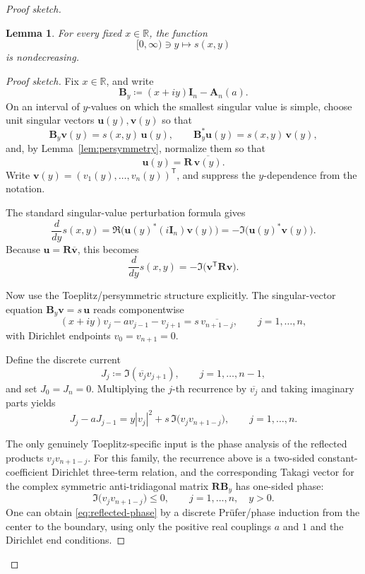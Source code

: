 \documentclass[11pt]{article}
\newtheorem{lemma}[theorem]{Lemma}
\begin{document}
\begin{proof}[Proof sketch]
\begin{lemma}\label{lem:vertical-monotonicity}
For every fixed \(x\in\mathbb R\), the function
\[
[0,\infty)\ni y\longmapsto s(x,y)
\]
is nondecreasing.
\end{lemma}

\begin{proof}[Proof sketch]
Fix \(x\in\mathbb R\), and write
\[
\mathbf B_y\coloneqq (x+iy)\mathbf I_n-\mathbf A_n(a).
\]
On an interval of \(y\)-values on which the smallest singular value is simple, choose
unit singular vectors \(\mathbf u(y),\mathbf v(y)\) so that
\[
\mathbf B_y\mathbf v(y)=s(x,y)\,\mathbf u(y),
\qquad
\mathbf B_y^*\mathbf u(y)=s(x,y)\,\mathbf v(y),
\]
and, by Lemma~\ref{lem:persymmetry}, normalize them so that
\[
\mathbf u(y)=\mathbf R\,\overline{\mathbf v(y)}.
\]
Write \(\mathbf v(y)=(v_1(y),\dots,v_n(y))^{\mathsf T}\), and suppress the \(y\)-dependence
from the notation.

The standard singular-value perturbation formula gives
\[
\frac{d}{dy}s(x,y)
=
\Re\!\bigl(\mathbf u(y)^* (i\mathbf I_n)\mathbf v(y)\bigr)
=
-\Im\!\bigl(\mathbf u(y)^*\mathbf v(y)\bigr).
\]
Because \(\mathbf u=\mathbf R\overline{\mathbf v}\), this becomes
\[
\frac{d}{dy}s(x,y)
=
-\Im\!\bigl(\mathbf v^{\mathsf T}\mathbf R\mathbf v\bigr).
\]

Now use the Toeplitz/persymmetric structure explicitly.  The singular-vector equation
\(\mathbf B_y\mathbf v=s\,\mathbf u\) reads componentwise
\[
(x+iy)v_j-a v_{j-1}-v_{j+1}
=
s\,\overline{v_{n+1-j}},
\qquad
j=1,\dots,n,
\]
with Dirichlet endpoints \(v_0=v_{n+1}=0\).

Define the discrete current
\[
J_j\coloneqq \Im(\overline{v_j}v_{j+1}),
\qquad
j=1,\dots,n-1,
\]
and set \(J_0=J_n=0\).
Multiplying the \(j\)-th recurrence by \(\overline{v_j}\) and taking imaginary parts yields
\[
J_j-aJ_{j-1}
=
y|v_j|^2+s\,\Im\!\bigl(v_jv_{n+1-j}\bigr),
\qquad
j=1,\dots,n.
\tag{$*$}
\label{eq:current}
\]

The only genuinely Toeplitz-specific input is the phase analysis of the reflected products
\(v_jv_{n+1-j}\).
For this family, the recurrence above is a two-sided constant-coefficient Dirichlet
three-term relation, and the corresponding Takagi vector for the complex symmetric
anti-tridiagonal matrix \(\mathbf R\mathbf B_y\) has one-sided phase:
\[
\Im\!\bigl(v_jv_{n+1-j}\bigr)\le 0,
\qquad
j=1,\dots,n,
\quad y>0.
\tag{$**$}
\label{eq:reflected-phase}
\]
One can obtain \eqref{eq:reflected-phase} by a discrete Prüfer/phase induction from the
center to the boundary, using only the positive real couplings \(a\) and \(1\) and the Dirichlet
end conditions.


\end{proof}
\end{proof}
\end{document}
